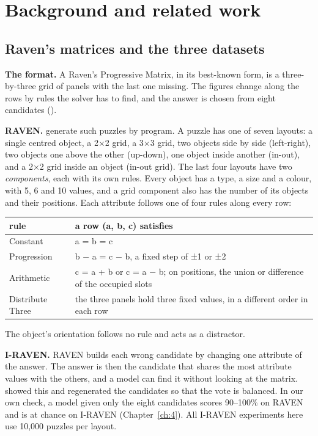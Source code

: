 \chapter{Background and related work}\label{ch:2}

\section{Raven's matrices and the three datasets}\label{sec:2.1}

\textbf{The format.} A Raven's Progressive Matrix, in its best-known form, is a three-by-three grid of panels with the last one missing. The figures change along the rows by rules the solver has to find, and the answer is chosen from eight candidates (\citealp{raven1938progressive}).

\textbf{RAVEN.} \citet{zhang2019raven} generate such puzzles by program. A puzzle has one of seven layouts: a single centred object, a 2×2 grid, a 3×3 grid, two objects side by side (left-right), two objects one above the other (up-down), one object inside another (in-out), and a 2×2 grid inside an object (in-out grid). The last four layouts have two \emph{components}, each with its own rules. Every object has a type, a size and a colour, with 5, 6 and 10 values, and a grid component also has the number of its objects and their positions. Each attribute follows one of four rules along every row:

\begin{center}\small
\begin{tabularx}{\linewidth}{@{}lY@{}}
\toprule
rule & a row (a, b, c) satisfies \\
\midrule
Constant & a = b = c \\
Progression & b − a = c − b, a fixed step of ±1 or ±2 \\
Arithmetic & c = a + b or c = a − b; on positions, the union or difference of the occupied slots \\
Distribute Three & the three panels hold three fixed values, in a different order in each row \\
\bottomrule
\end{tabularx}
\end{center}

The object's orientation follows no rule and acts as a distractor.

\textbf{I-RAVEN.} RAVEN builds each wrong candidate by changing one attribute of the answer. The answer is then the candidate that shares the most attribute values with the others, and a model can find it without looking at the matrix. \citet{hu2021stratified} showed this and regenerated the candidates so that the vote is balanced. In our own check, a model given only the eight candidates scores 90–100\% on RAVEN and is at chance on I-RAVEN (Chapter~\ref{ch:4}). All I-RAVEN experiments here use 10,000 puzzles per layout.

